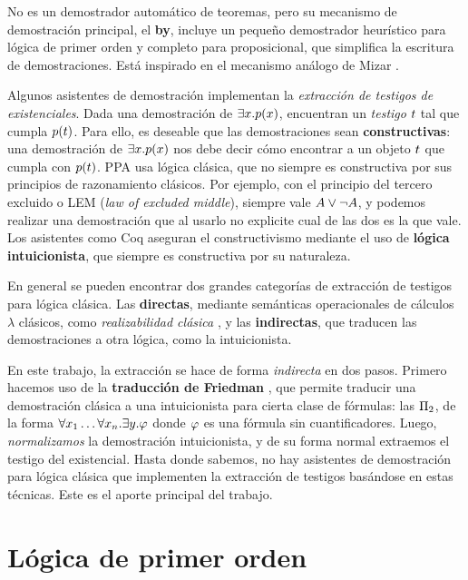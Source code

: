 No es un demostrador automático de teoremas, pero su mecanismo de demostración
principal, el \textbf{by}, incluye un pequeño demostrador heurístico para lógica
de primer orden y completo para proposicional, que simplifica la escritura de
demostraciones. Está inspirado en el mecanismo análogo de Mizar \cite{freek-by}.

Algunos asistentes de demostración implementan la \textit{extracción de testigos
de existenciales}. Dada una demostración de $\exists x . p(x)$,
encuentran un \textit{testigo} $t$ tal que cumpla $p(t)$. Para ello,
es deseable que las demostraciones sean \textbf{constructivas}: una demostración
de $\exists x . p(x)$ nos debe decir cómo encontrar a un objeto
$t$ que cumpla con $p(t)$. PPA usa lógica clásica, que no siempre es constructiva por sus principios de razonamiento clásicos. Por ejemplo, con el principio del tercero excluido o LEM (\textit{law of excluded middle}), siempre
vale $A \vee \neg A$, y podemos realizar una demostración que al usarlo no explicite cual de las dos es la que vale. Los asistentes como Coq
aseguran el constructivismo mediante el uso de \textbf{lógica intuicionista},
que siempre es constructiva por su naturaleza.

En general se pueden encontrar dos grandes categorías de extracción de testigos para lógica clásica. Las \textbf{directas}, mediante semánticas operacionales de cálculos $\lambda$ clásicos, como \textit{realizabilidad clásica} \cite{miquel-friedman}, y las \textbf{indirectas}, que traducen las demostraciones a otra lógica, como la intuicionista.

En este trabajo, la extracción se hace de forma \textit{indirecta} en dos pasos.
Primero hacemos uso de la \textbf{traducción de Friedman}
\cite{selinger-friedman}, que permite traducir una demostración clásica a una
intuicionista para cierta clase de fórmulas: las $\Pi_{2}$, de la forma
$\forall x_1 \dots \forall x_n . \exists y . \varphi$ donde $\varphi$ es una fórmula sin cuantificadores. Luego,
\textit{normalizamos} la demostración intuicionista, y de su forma normal
extraemos el testigo del existencial. Hasta donde sabemos, no hay asistentes de demostración para lógica clásica que implementen la extracción de testigos basándose en estas técnicas. Este es el aporte principal del trabajo.

\section{Lógica de primer orden}

